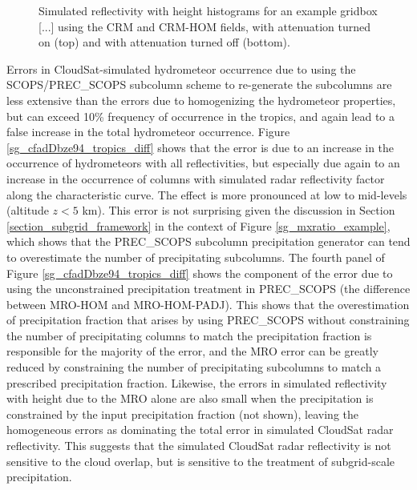 \begin{figure}
\caption{Simulated reflectivity with height histograms for an example gridbox [...] using the CRM and CRM-HOM fields, with attenuation turned on (top) and with attenuation turned off (bottom).}
\label{sg_cfadDbze94_testatt}
\end{figure}

Errors in CloudSat-simulated hydrometeor occurrence due to using the SCOPS/PREC\_SCOPS subcolumn scheme to re-generate the subcolumns are less extensive than the errors due to homogenizing the hydrometeor properties, but can exceed 10\% frequency of occurrence in the tropics, and again lead to a false increase in the total hydrometeor occurrence. Figure \ref{sg_cfadDbze94_tropics_diff} shows that the error is due to an increase in the occurrence of hydrometeors with all reflectivities, but especially due again to an increase in the occurrence of columns with simulated radar reflectivity factor along the characteristic curve. The effect is more pronounced at low to mid-levels (altitude $z < 5$ km). This error is not surprising given the discussion in Section \ref{section_subgrid_framework} in the context of Figure \ref{sg_mxratio_example}, which shows that the PREC\_SCOPS subcolumn precipitation generator can tend to overestimate the number of precipitating subcolumns. The fourth panel of Figure \ref{sg_cfadDbze94_tropics_diff} shows the component of the error due to using the unconstrained precipitation treatment in PREC\_SCOPS (the difference between MRO-HOM and MRO-HOM-PADJ). This shows that the overestimation of precipitation fraction that arises by using PREC\_SCOPS without constraining the number of precipitating columns to match the precipitation fraction is responsible for the majority of the error, and the MRO error can be greatly reduced by constraining the number of precipitating subcolumns to match a prescribed precipitation fraction. Likewise, the errors in simulated reflectivity with height due to the MRO alone are also small when the precipitation is constrained by the input precipitation fraction (not shown), leaving the homogeneous errors as dominating the total error in simulated CloudSat radar reflectivity. This suggests that the simulated CloudSat radar reflectivity is not sensitive to the cloud overlap, but is sensitive to the treatment of subgrid-scale precipitation.

